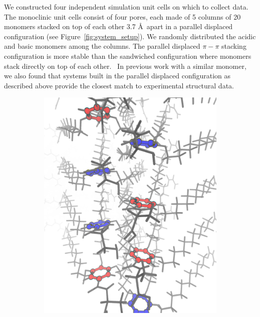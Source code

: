 \documentclass{article}
\begin{document}
  We constructed four independent simulation unit cells on which to collect data.  
  The monoclinic unit cells consist of four pores, each made of 5 columns of 20
  monomers stacked on top of each other 3.7 \AA~apart in a parallel displaced 
  configuration (see Figure~\ref{fig:system_setup}). We randomly distributed the
  acidic and basic monomers among the columns. The parallel displaced $\pi-\pi$ 
  stacking configuration is more stable than the sandwiched configuration
  where monomers stack directly on top of each other.~\cite{sinnokrot_estimates_2002}
  In previous work with a similar monomer, we also found that systems built in the
  parallel displaced configuration as described above provide the closest match 
  to experimental structural data.~\cite{coscia_understanding_2019}

  \begin{figure}
  \centering
  \begin{subfigure}{0.34\textwidth}
  \includegraphics[width=\textwidth]{column.pdf}
  \caption{}\label{fig:column}
  \end{subfigure}

\end{figure}
\end{document}
